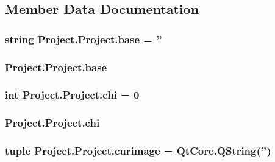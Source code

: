\subsection{Member Data Documentation}
\hypertarget{class_project_1_1_project_a3fa761a117618c8524b700ceb2c7122f}{
\subsubsection[{base}]{\setlength{\rightskip}{0pt plus 5cm}string Project.\-Project.\-base = ''\hspace{0.3cm}{\ttfamily [static]}}}\label{class_project_1_1_project_a3fa761a117618c8524b700ceb2c7122f}
\hypertarget{class_project_1_1_project_a4a1a26e41d50eafb9a1ecd7c344ae974}{
\subsubsection[{base}]{\setlength{\rightskip}{0pt plus 5cm}Project.\-Project.\-base}}\label{class_project_1_1_project_a4a1a26e41d50eafb9a1ecd7c344ae974}
\hypertarget{class_project_1_1_project_a2b04fbe0238d23490f6482a17046da9a}{
\subsubsection[{chi}]{\setlength{\rightskip}{0pt plus 5cm}int Project.\-Project.\-chi = 0\hspace{0.3cm}{\ttfamily [static]}}}\label{class_project_1_1_project_a2b04fbe0238d23490f6482a17046da9a}
\hypertarget{class_project_1_1_project_aae1d33efbce822c8023528ff7f3b841a}{
\subsubsection[{chi}]{\setlength{\rightskip}{0pt plus 5cm}Project.\-Project.\-chi}}\label{class_project_1_1_project_aae1d33efbce822c8023528ff7f3b841a}
\hypertarget{class_project_1_1_project_aa523085a77fa7d77f1e8112dc95aa35b}{
\subsubsection[{curimage}]{\setlength{\rightskip}{0pt plus 5cm}tuple Project.\-Project.\-curimage = Qt\-Core.\-Q\-String('')\hspace{0.3cm}{\ttfamily [static]}}}\label{class_project_1_1_project_aa523085a77fa7d77f1e8112dc95aa35b}
